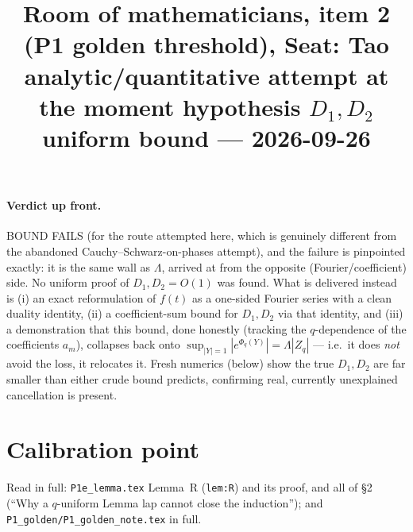\documentclass[11pt]{article}
\title{Room of mathematicians, item 2 (P1 golden threshold), Seat: Tao\\
\small analytic/quantitative attempt at the moment hypothesis $D_1,D_2$ uniform bound --- 2026-09-26}
\date{}
\theoremstyle{remark}\newtheorem{remark}[theorem]{Remark}
\begin{document}
\maketitle

\paragraph{Verdict up front.} BOUND FAILS (for the route attempted here, which is genuinely different from the abandoned Cauchy--Schwarz-on-phases attempt), and the failure is pinpointed exactly: it is the same wall as $\Lambda$, arrived at from the opposite (Fourier/coefficient) side. No uniform proof of $D_1,D_2=O(1)$ was found. What is delivered instead is (i) an exact reformulation of $f(t)$ as a one-sided Fourier series with a clean duality identity, (ii) a coefficient-sum bound for $D_1,D_2$ via that identity, and (iii) a demonstration that this bound, done honestly (tracking the $q$-dependence of the coefficients $a_m$), collapses back onto $\sup_{|Y|=1}|e^{\Phi_q(Y)}|=\Lambda|Z_q|$ --- i.e.\ it does \emph{not} avoid the loss, it relocates it. Fresh numerics (below) show the true $D_1,D_2$ are far smaller than either crude bound predicts, confirming real, currently unexplained cancellation is present.

\section{Calibration point}
Read in full: \texttt{P1e\_lemma.tex} Lemma~R (\texttt{lem:R}) and its proof, and all of \S2 (``Why a $q$-uniform Lemma lap cannot close the induction''); and \texttt{P1\_golden/P1\_golden\_note.tex} in full.
\end{document}
